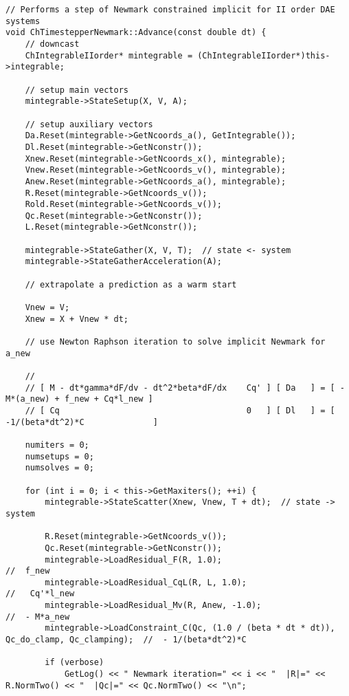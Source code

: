 \begin{verbatim}
// Performs a step of Newmark constrained implicit for II order DAE systems
void ChTimestepperNewmark::Advance(const double dt) {
    // downcast
    ChIntegrableIIorder* mintegrable = (ChIntegrableIIorder*)this->integrable;

    // setup main vectors
    mintegrable->StateSetup(X, V, A);

    // setup auxiliary vectors
    Da.Reset(mintegrable->GetNcoords_a(), GetIntegrable());
    Dl.Reset(mintegrable->GetNconstr());
    Xnew.Reset(mintegrable->GetNcoords_x(), mintegrable);
    Vnew.Reset(mintegrable->GetNcoords_v(), mintegrable);
    Anew.Reset(mintegrable->GetNcoords_a(), mintegrable);
    R.Reset(mintegrable->GetNcoords_v());
    Rold.Reset(mintegrable->GetNcoords_v());
    Qc.Reset(mintegrable->GetNconstr());
    L.Reset(mintegrable->GetNconstr());

    mintegrable->StateGather(X, V, T);  // state <- system
    mintegrable->StateGatherAcceleration(A);

    // extrapolate a prediction as a warm start

    Vnew = V;
    Xnew = X + Vnew * dt;

    // use Newton Raphson iteration to solve implicit Newmark for a_new

    //
    // [ M - dt*gamma*dF/dv - dt^2*beta*dF/dx    Cq' ] [ Da   ] = [ -M*(a_new) + f_new + Cq*l_new ]
    // [ Cq                                      0   ] [ Dl   ] = [ -1/(beta*dt^2)*C              ]

    numiters = 0;
    numsetups = 0;
    numsolves = 0;

    for (int i = 0; i < this->GetMaxiters(); ++i) {
        mintegrable->StateScatter(Xnew, Vnew, T + dt);  // state -> system

        R.Reset(mintegrable->GetNcoords_v());
        Qc.Reset(mintegrable->GetNconstr());
        mintegrable->LoadResidual_F(R, 1.0);                                                    //  f_new
        mintegrable->LoadResidual_CqL(R, L, 1.0);                                               //   Cq'*l_new
        mintegrable->LoadResidual_Mv(R, Anew, -1.0);                                            //  - M*a_new
        mintegrable->LoadConstraint_C(Qc, (1.0 / (beta * dt * dt)), Qc_do_clamp, Qc_clamping);  //  - 1/(beta*dt^2)*C

        if (verbose)
            GetLog() << " Newmark iteration=" << i << "  |R|=" << R.NormTwo() << "  |Qc|=" << Qc.NormTwo() << "\n";


\end{verbatim}
